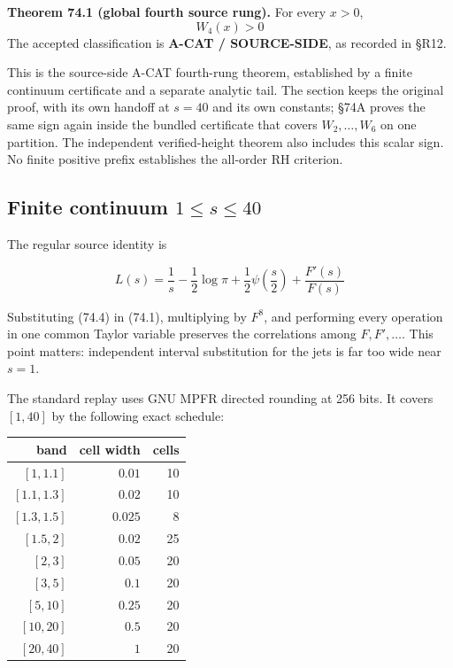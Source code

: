 \documentclass[
  11pt,
]{book}
\renewenvironment{quote}
  {\begin{tcolorbox}[
      enhanced,
      breakable,
      colback=tncream,
      colframe=tnrust,
      boxrule=0.8pt,
      arc=1.5pt,
      left=7pt,
      right=7pt,
      top=6pt,
      bottom=6pt]}
  {\end{tcolorbox}}
\begin{document}
\begin{quote}
\textbf{Theorem 74.1 (global fourth source rung).} For every \(x>0\), \[
\boxed{W_4(x)>0}
\tag{74.3}
\] The accepted classification is \textbf{A-CAT / SOURCE-SIDE}, as
recorded in §R12.

This is the source-side A-CAT fourth-rung theorem, established by a
finite continuum certificate and a separate analytic tail. The section
keeps the original proof, with its own handoff at \(s=40\) and its own
constants; §74A proves the same sign again inside the bundled
certificate that covers \(W_2,\ldots,W_6\) on one partition. The
independent verified-height theorem also includes this scalar sign. No
finite positive prefix establishes the all-order RH criterion.
\end{quote}

\subsection{\texorpdfstring{Finite continuum
\(1\le s\le40\)}{Finite continuum 1\textbackslash le s\textbackslash le40}}\label{finite-continuum-1le-sle40}

The regular source identity is

\[
L(s)=\frac1s-\frac12\log\pi+\frac12\psi\!\left(\frac s2\right)
+\frac{F'(s)}{F(s)}
\tag{74.4}
\]

Substituting (74.4) in (74.1), multiplying by \(F^8\), and performing
every operation in one common Taylor variable preserves the correlations
among \(F,F',\ldots\). This point matters: independent interval
substitution for the jets is far too wide near \(s=1\).

The standard replay uses GNU MPFR directed rounding at 256 bits. It
covers \([1,40]\) by the following exact schedule:

\begin{longtable}[]{@{}rrr@{}}
\toprule\noalign{}
band & cell width & cells \\
\midrule\noalign{}
\endhead
\bottomrule\noalign{}
\endlastfoot
\([1,1.1]\) & \(0.01\) & 10 \\
\([1.1,1.3]\) & \(0.02\) & 10 \\
\([1.3,1.5]\) & \(0.025\) & 8 \\
\([1.5,2]\) & \(0.02\) & 25 \\
\([2,3]\) & \(0.05\) & 20 \\
\([3,5]\) & \(0.1\) & 20 \\
\([5,10]\) & \(0.25\) & 20 \\
\([10,20]\) & \(0.5\) & 20 \\
\([20,40]\) & \(1\) & 20 \\
\end{longtable}
\end{document}
